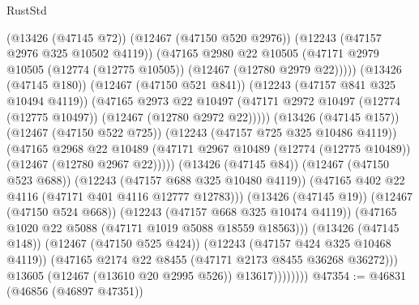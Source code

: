 \begin{lexlean}{RustStd}
\begin{coremodule}
                                (@13426 (@47145 @72))
                                (@12467 (@47150 @520 @2976))
                                (@12243 (@47157 @2976 @325 @10502 @4119))
                                (@47165
                                  @2980
                                  @22
                                  @10505
                                  (@47171
                                    @2979
                                    @10505
                                    (@12774 (@12775 @10505))
                                    (@12467 (@12780 @2979 @22)))))
                              (@13426 (@47145 @180))
                              (@12467 (@47150 @521 @841))
                              (@12243 (@47157 @841 @325 @10494 @4119))
                              (@47165
                                @2973
                                @22
                                @10497
                                (@47171
                                  @2972
                                  @10497
                                  (@12774 (@12775 @10497))
                                  (@12467 (@12780 @2972 @22)))))
                            (@13426 (@47145 @157))
                            (@12467 (@47150 @522 @725))
                            (@12243 (@47157 @725 @325 @10486 @4119))
                            (@47165
                              @2968
                              @22
                              @10489
                              (@47171
                                @2967
                                @10489
                                (@12774 (@12775 @10489))
                                (@12467 (@12780 @2967 @22)))))
                          (@13426 (@47145 @84))
                          (@12467 (@47150 @523 @688))
                          (@12243 (@47157 @688 @325 @10480 @4119))
                          (@47165 @402 @22 @4116 (@47171 @401 @4116 @12777 @12783)))
                        (@13426 (@47145 @19))
                        (@12467 (@47150 @524 @668))
                        (@12243 (@47157 @668 @325 @10474 @4119))
                        (@47165 @1020 @22 @5088 (@47171 @1019 @5088 @18559 @18563)))
                      (@13426 (@47145 @148))
                      (@12467 (@47150 @525 @424))
                      (@12243 (@47157 @424 @325 @10468 @4119))
                      (@47165 @2174 @22 @8455 (@47171 @2173 @8455 @36268 @36272)))
                    @13605
                    (@12467 (@13610 @20 @2995 @526))
                    @13617))))))))
@47354 := @46831 (@46856 (@46897 @47351))

\end{coremodule}
\end{lexlean}
